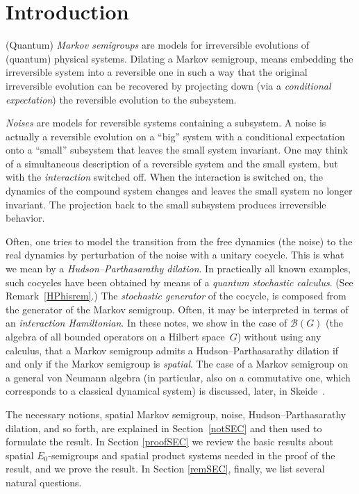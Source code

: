 \documentclass[11pt]{article}
\numberwithin{equation}{section}
\newcommand{\eus}[1]{\mathscr{#1}}
\newcommand{\sB}{\eus{B}}
\numberwithin{equation}{section}
\begin{document}
\section{Introduction}

(Quantum) {\it Markov semigroups} are models for irreversible evolutions of (quantum) physical systems. Dilating a Markov semigroup, means embedding the irreversible system into a reversible one in such a way that the original irreversible evolution can be recovered by projecting down (via a {\it conditional expectation}) the reversible evolution to the subsystem.

{\it Noises} are models for reversible systems containing a subsystem. A noise is actually a reversible evolution on a ``big'' system with a conditional expectation onto a ``small'' subsystem that leaves the small system invariant. One may think of a simultaneous description of a reversible system and the small system, but with the {\it interaction} switched off. When the interaction is switched on, the dynamics of the compound system changes and leaves the small system no longer invariant. The projection back to the small subsystem produces irreversible behavior.

Often, one tries to model the transition from the free dynamics (the noise) to the real dynamics by perturbation of the noise with a unitary cocycle. This is what we mean by a {\it Hudson--Parthasarathy dilation}. In practically all known examples, such cocycles have been obtained by means of a {\it quantum stochastic calculus}. (See Remark~\ref{HPhisrem}.) The {\it stochastic generator} of the cocycle, is composed from the generator of the Markov semigroup. Often, it may be interpreted in terms of an {\it interaction Hamiltonian}. In these notes, we show in the case of $\sB(G)$ (the algebra of all bounded operators on a Hilbert space~$G$) without using any calculus, that a Markov semigroup admits a Hudson--Parthasarathy dilation if and only if the Markov semigroup is {\it spatial}. The case of a Markov semigroup on a general von Neumann algebra (in particular, also on a commutative one, which corresponds to a classical dynamical system) is discussed, later, in Skeide~\cite{Ske16}.

The necessary notions, spatial Markov semigroup, noise, Hudson--Parthasarathy dilation, and so forth, are explained in Section~\ref{notSEC} and then used to formulate the result. In Section \ref{proofSEC} we review the basic results about spatial $E_0$-semigroups and spatial product systems needed in the proof of the result, and we prove the result. In Section \ref{remSEC}, finally, we list several natural questions.
\end{document}
